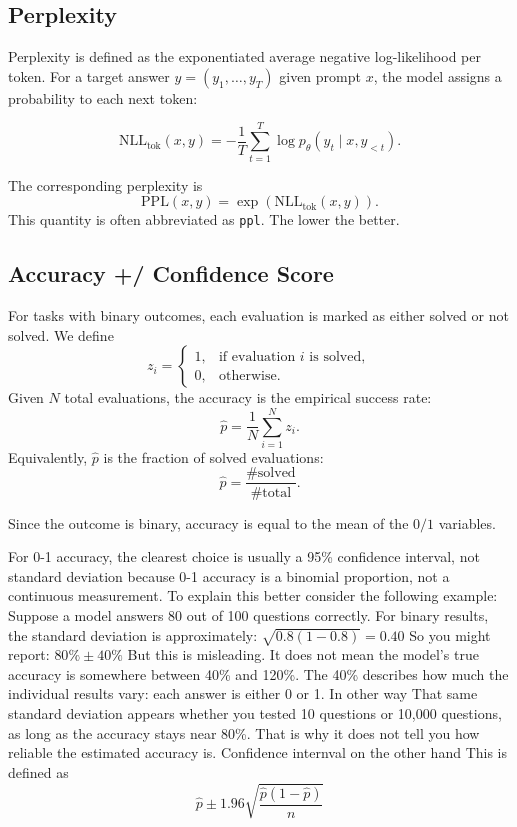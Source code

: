 \subsection*{Perplexity}
Perplexity is defined as the exponentiated average negative log-likelihood per token.
For a target answer \(y = (y_1,\dots,y_T)\) given prompt \(x\), the model assigns a probability to each next token:

\[
\mathrm{NLL}_{\text{tok}}(x,y)
=
-\frac{1}{T}\sum_{t=1}^{T}
\log p_\theta(y_t\mid x,y_{<t}).
\]

The corresponding perplexity is
\[
\mathrm{PPL}(x,y)
=
\exp\left(\mathrm{NLL}_{\text{tok}}(x,y)\right).
\]
This quantity is often abbreviated as \texttt{ppl}.
The lower the better.


\subsection*{Accuracy +/ Confidence Score}
For tasks with binary outcomes, each evaluation is marked as either solved or not solved.
We define
\[
z_i =
\begin{cases}
1, & \text{if evaluation } i \text{ is solved},\\
0, & \text{otherwise}.
\end{cases}
\]
Given \(N\) total evaluations, the accuracy is the empirical success rate:
\[
\hat{p}
=
\frac{1}{N}\sum_{i=1}^{N} z_i.
\]
Equivalently, \(\hat{p}\) is the fraction of solved evaluations:
\[
\hat{p}
=
\frac{\#\text{solved}}{\#\text{total}}.
\]

Since the outcome is binary, accuracy is equal to the mean of the \(0/1\) variables.

For 0-1 accuracy, the clearest choice is usually a 95\% confidence interval, not standard deviation because 0-1 accuracy is a binomial proportion, not a continuous measurement.
To explain this better consider the following example:
Suppose a model answers 80 out of 100 questions correctly.
For binary results, the standard deviation is approximately:
\(\sqrt{0.8(1-0.8)} = 0.40\)
So you might report:
\(80\% \pm 40\%\)
But this is misleading. 
It does not mean the model's true accuracy is somewhere between 40\% and 120\%.
The 40\% describes how much the individual results vary: each answer is either 0 or 1.
In other way That same standard deviation appears whether you tested 10 questions or 10,000 questions, as long as the accuracy stays near 80\%. 
That is why it does not tell you how reliable the estimated accuracy is.
Confidence internval on the other hand 
This is defined as 
\[
\hat p \pm 1.96 \sqrt{\frac{\hat p(1-\hat p)}{n}}
\]


